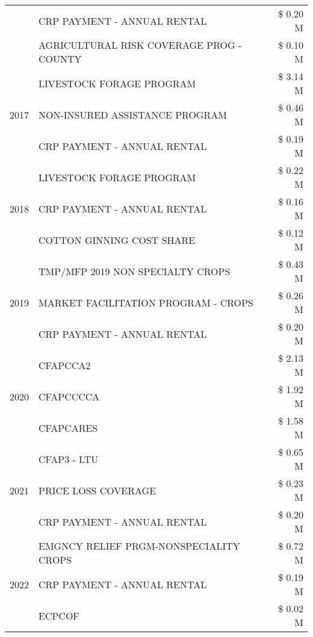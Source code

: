 \begin{tabular}{llr}
 & CRP PAYMENT - ANNUAL RENTAL & \$ 0.20 M \\
 & AGRICULTURAL RISK COVERAGE PROG - COUNTY & \$ 0.10 M \\
\cline{1-3}
\multirow[t]{3}{*}{2017} & LIVESTOCK FORAGE PROGRAM & \$ 3.14 M \\
 & NON-INSURED ASSISTANCE PROGRAM & \$ 0.46 M \\
 & CRP PAYMENT - ANNUAL RENTAL & \$ 0.19 M \\
\cline{1-3}
\multirow[t]{3}{*}{2018} & LIVESTOCK FORAGE PROGRAM & \$ 0.22 M \\
 & CRP PAYMENT - ANNUAL RENTAL & \$ 0.16 M \\
 & COTTON GINNING COST SHARE & \$ 0.12 M \\
\cline{1-3}
\multirow[t]{3}{*}{2019} & TMP/MFP 2019 NON SPECIALTY CROPS & \$ 0.43 M \\
 & MARKET FACILITATION PROGRAM - CROPS & \$ 0.26 M \\
 & CRP PAYMENT - ANNUAL RENTAL & \$ 0.20 M \\
\cline{1-3}
\multirow[t]{3}{*}{2020} & CFAPCCA2 & \$ 2.13 M \\
 & CFAPCCCCA & \$ 1.92 M \\
 & CFAPCARES & \$ 1.58 M \\
\cline{1-3}
\multirow[t]{3}{*}{2021} & CFAP3 - LTU & \$ 0.65 M \\
 & PRICE LOSS COVERAGE & \$ 0.23 M \\
 & CRP PAYMENT - ANNUAL RENTAL & \$ 0.20 M \\
\cline{1-3}
\multirow[t]{3}{*}{2022} & EMGNCY RELIEF PRGM-NONSPECIALITY CROPS & \$ 0.72 M \\
 & CRP PAYMENT - ANNUAL RENTAL & \$ 0.19 M \\
 & ECPCOF & \$ 0.02 M \\
\cline{1-3}
\bottomrule
\end{tabular}
